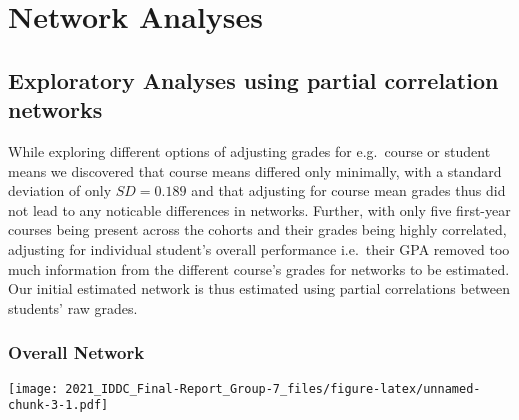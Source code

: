 \documentclass[
]{article}
\newenvironment{Shaded}{\begin{snugshade}}{\end{snugshade}}
\newcommand{\DataTypeTok}[1]{\textcolor[rgb]{0.13,0.29,0.53}{#1}}
\newcommand{\DecValTok}[1]{\textcolor[rgb]{0.00,0.00,0.81}{#1}}
\newcommand{\KeywordTok}[1]{\textcolor[rgb]{0.13,0.29,0.53}{\textbf{#1}}}
\newcommand{\NormalTok}[1]{#1}
\newcommand{\OperatorTok}[1]{\textcolor[rgb]{0.81,0.36,0.00}{\textbf{#1}}}
\newcommand{\StringTok}[1]{\textcolor[rgb]{0.31,0.60,0.02}{#1}}
\begin{document}
\hypertarget{network-analyses}{%
\section{Network Analyses}\label{network-analyses}}

\hypertarget{exploratory-analyses-using-partial-correlation-networks}{%
\subsection{Exploratory Analyses using partial correlation
networks}\label{exploratory-analyses-using-partial-correlation-networks}}

While exploring different options of adjusting grades for e.g.~course or
student means we discovered that course means differed only minimally,
with a standard deviation of only \(SD = 0.189\) and that adjusting for
course mean grades thus did not lead to any noticable differences in
networks. Further, with only five first-year courses being present
across the cohorts and their grades being highly correlated, adjusting
for individual student's overall performance i.e.~their GPA removed too
much information from the different course's grades for networks to be
estimated. Our initial estimated network is thus estimated using partial
correlations between students' raw grades.

\hypertarget{overall-network}{%
\subsubsection{Overall Network}\label{overall-network}}

\begin{Shaded}
\end{Shaded}

\texttt{[image: 2021\_IDDC\_Final-Report\_Group-7\_files/figure-latex/unnamed-chunk-3-1.pdf]}
\end{document}
